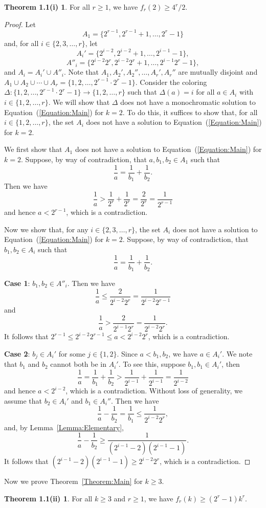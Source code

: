 \documentclass[11pt]{article}
\theoremstyle{definition}
\newtheorem*{thm1.1PartI}{Theorem 1.1(i)}
\newtheorem*{thm1.1PartII}{Theorem 1.1(ii)}
\begin{document}
\begin{thm1.1PartI}\label{Lemma:CommonCoefficients_K=2}
    For all $r\geq1$, we have $f_r(2)\geq4^r/2$.
\end{thm1.1PartI}
\begin{proof}
Let
\[
A_1=\{2^{r-1},2^{r-1}+1,\ldots,2^r-1\}
\]
and, for all $i\in\{2,3,\ldots,r\}$, let 
\[
A_i'=\{2^{i-2},2^{i-2}+1,\ldots,2^{i-1}-1\},
\]    
\[
A''_i=\{2^{i-2}2^{r},2^{i-2}2^{r}+1,\ldots,2^{i-1}2^{r}-1\},
\]
and $A_i=A_i'\cup A''_i$. Note that $A_1,A_2',A_2'',\ldots,A_r',A_r''$ are mutually disjoint and $A_1\cup A_2\cup\cdots\cup A_r=\{1,2,\ldots,2^{r-1}\cdot2^r-1\}$. Consider the coloring $\Delta:\{1,2,\ldots,2^{r-1}\cdot2^r-1\}\to\{1,2,\ldots,r\}$ such that $\Delta(a)=i$ for all $a\in A_i$ with $i\in\{1,2,\ldots,r\}$. We will show that $\Delta$ does not have a monochromatic solution to Equation~(\ref{Equation:Main}) for $k=2$. To do this, it suffices to show that, for all $i\in\{1,2,\ldots,r\}$, the set $A_i$ does not have a solution to Equation~(\ref{Equation:Main}) for $k=2$.

We first show that $A_1$ does not have a solution to Equation~(\ref{Equation:Main}) for $k=2$. Suppose, by way of contradiction, that $a,b_1,b_2\in A_1$ such that
\[
\frac{1}{a}=\frac{1}{b_1}+\frac{1}{b_2}.
\]
Then we have
\[
\frac{1}{a}>\frac{1}{2^r}+\frac{1}{2^r}=\frac{2}{2^r}=\frac{1}{2^{r-1}}
\]
and hence $a<2^{r-1}$, which is a contradiction.

Now we show that, for any $i\in\{2,3,\ldots,r\}$, the set $A_i$ does not have a solution to Equation~(\ref{Equation:Main}) for $k=2$. Suppose, by way of contradiction, that $b_1,b_2\in A_i$ such that
\[
\frac{1}{a}=\frac{1}{b_1}+\frac{1}{b_2}.
\]

{\bf Case 1}: $b_1,b_2\in A''_i$. Then we have
\[
\frac{1}{a}\leq\frac{2}{2^{i-2}2^r}=\frac{1}{2^{i-2}2^{r-1}}
\]
and
\[
\frac{1}{a}>\frac{2}{2^{i-1}2^r}=\frac{1}{2^{i-2}2^r}.
\]
It follows that $2^{r-1}\leq 2^{i-2}2^{r-1}\leq a<2^{i-2}2^r$, which is a contradiction.

{\bf Case 2}: $b_j\in A_i'$ for some $j\in\{1,2\}$. Since $a<b_1,b_2$, we have $a\in A_i'$. We note that $b_1$ and $b_2$ cannot both be in $A_i'$. To see this, suppose $b_1,b_1\in A_i'$, then
\[
\frac{1}{a}=\frac{1}{b_1}+\frac{1}{b_2}>\frac{1}{2^{i-1}}+\frac{1}{2^{i-1}}=\frac{1}{2^{i-2}}
\]
and hence $a<2^{i-2}$, which is a contradiction. Without loss of generality, we assume that $b_2\in A_i'$ and $b_1\in A_i''$. Then we have
\[
\frac{1}{a}-\frac{1}{b_2}=\frac{1}{b_1}\leq \frac{1}{2^{i-2}2^r},
\]
and, by Lemma~\ref{Lemma:Elementary},
\[
\frac{1}{a}-\frac{1}{b_2}\geq\frac{1}{(2^{i-1}-2)(2^{i-1}-1)}.
\]
It follows that $(2^{i-1}-2)(2^{i-1}-1)\geq2^{i-2}2^r$, which is a contradiction.
\end{proof}
Now we prove Theorem~\ref{Theorem:Main} for $k\geq3$.
\begin{thm1.1PartII}\label{Lemma:CommonCoefficients_k>=3}
    For all $k\geq3$ and $r\geq1$, we have $f_r(k)\geq(2^r-1)k^r$.
\end{thm1.1PartII}
\end{document}
